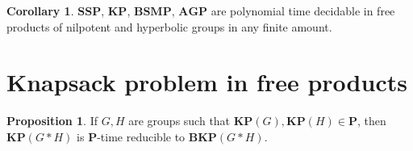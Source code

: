 \documentclass[10pt]{amsart}
\theoremstyle{definition}
\newtheorem{proposition}[theorem]{Proposition}
\newtheorem{corollary}[theorem]{Corollary}
\def\P{{\mathbf{P}}}
\def\SSP{{\mathbf{SSP}}}
\def\BSMP{{\mathbf{BSMP}}}
\def\BKP{{\mathbf{BKP}}}
\def\KP{{\mathbf{KP}}}
\def\AGP{{\mathbf{AGP}}}
\begin{document}
\begin{corollary}
$\SSP$, $\KP$, $\BSMP$, $\AGP$ are polynomial time decidable in free products of nilpotent and hyperbolic groups in any finite amount.
\end{corollary}

\section{Knapsack problem in free products}\label{sec:knapsack}

\begin{proposition}
If $G,H$ are groups such that $\KP(G),\KP(H)\in\P$, then $\KP(G*H)$ is $\P$-time reducible to $\BKP(G*H)$.
\end{proposition}


%

\end{document}
